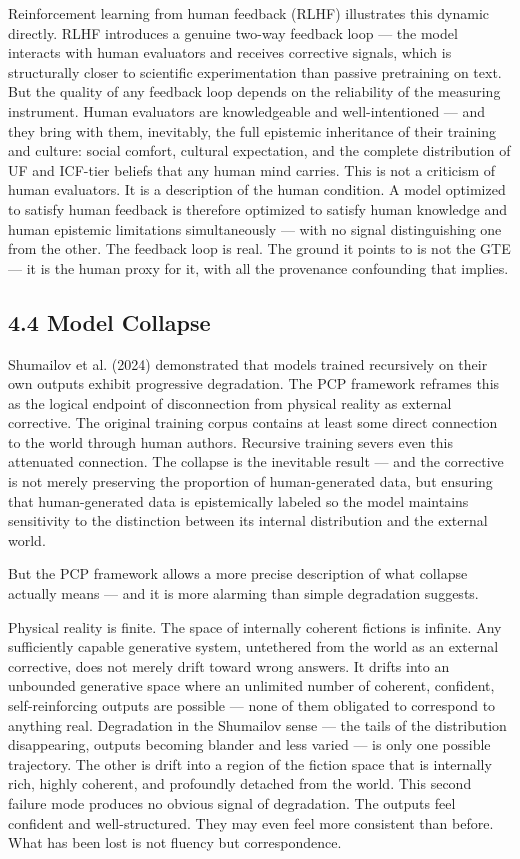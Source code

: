 \documentclass[
]{article}
\begin{document}
Reinforcement learning from human feedback (RLHF) illustrates this
dynamic directly. RLHF introduces a genuine two-way feedback loop ---
the model interacts with human evaluators and receives corrective
signals, which is structurally closer to scientific experimentation than
passive pretraining on text. But the quality of any feedback loop
depends on the reliability of the measuring instrument. Human evaluators
are knowledgeable and well-intentioned --- and they bring with them,
inevitably, the full epistemic inheritance of their training and
culture: social comfort, cultural expectation, and the complete
distribution of UF and ICF-tier beliefs that any human mind carries.
This is not a criticism of human evaluators. It is a description of the
human condition. A model optimized to satisfy human feedback is
therefore optimized to satisfy human knowledge and human epistemic
limitations simultaneously --- with no signal distinguishing one from
the other. The feedback loop is real. The ground it points to is not the
GTE --- it is the human proxy for it, with all the provenance
confounding that implies.

\subsection{4.4 Model Collapse}\label{model-collapse}

Shumailov et al. (2024) demonstrated that models trained recursively on
their own outputs exhibit progressive degradation. The PCP framework
reframes this as the logical endpoint of disconnection from physical
reality as external corrective. The original training corpus contains at
least some direct connection to the world through human authors.
Recursive training severs even this attenuated connection. The collapse
is the inevitable result --- and the corrective is not merely preserving
the proportion of human-generated data, but ensuring that
human-generated data is epistemically labeled so the model maintains
sensitivity to the distinction between its internal distribution and the
external world.

But the PCP framework allows a more precise description of what collapse
actually means --- and it is more alarming than simple degradation
suggests.

Physical reality is finite. The space of internally coherent fictions is
infinite. Any sufficiently capable generative system, untethered from
the world as an external corrective, does not merely drift toward wrong
answers. It drifts into an unbounded generative space where an unlimited
number of coherent, confident, self-reinforcing outputs are possible ---
none of them obligated to correspond to anything real. Degradation in
the Shumailov sense --- the tails of the distribution disappearing,
outputs becoming blander and less varied --- is only one possible
trajectory. The other is drift into a region of the fiction space that
is internally rich, highly coherent, and profoundly detached from the
world. This second failure mode produces no obvious signal of
degradation. The outputs feel confident and well-structured. They may
even feel more consistent than before. What has been lost is not fluency
but correspondence.
\end{document}
